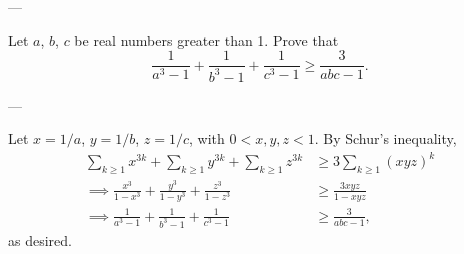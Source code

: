 
---

Let $a$, $b$, $c$ be real numbers greater than 1. Prove that
\[\frac1{a^3-1}+\frac1{b^3-1}+\frac1{c^3-1}\ge\frac3{abc-1}.\]

---

Let $x=1/a$, $y=1/b$, $z=1/c$, with $0<x,y,z<1$. By Schur's inequality,
\begin{align*}
    \sum_{k\ge1}x^{3k}+\sum_{k\ge1}y^{3k}+\sum_{k\ge1}z^{3k}&\ge3\sum_{k\ge1}(xyz)^k\\
    \implies\frac{x^3}{1-x^3}+\frac{y^3}{1-y^3}+\frac{z^3}{1-z^3}&\ge\frac{3xyz}{1-xyz}\\
    \implies\frac1{a^3-1}+\frac1{b^3-1}+\frac1{c^3-1}&\ge\frac3{abc-1},
\end{align*}
as desired.

